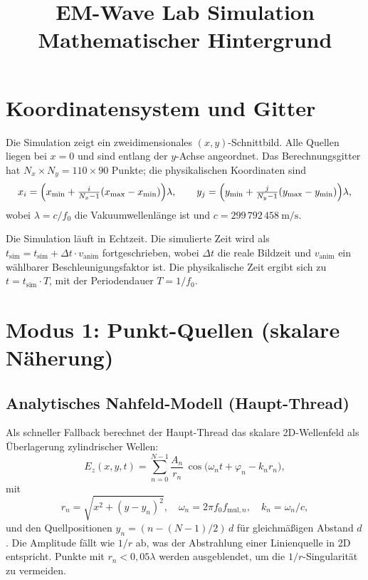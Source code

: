 \documentclass[11pt,a4paper]{article}
\title{\textbf{EM-Wave Lab Simulation}\\[0.4em]
       \large Mathematischer Hintergrund}
\author{}
\date{}
\begin{document}
\maketitle
\tableofcontents
\bigskip

\section{Koordinatensystem und Gitter}

Die Simulation zeigt ein zweidimensionales $(x,y)$-Schnittbild.  Alle
Quellen liegen bei $x = 0$ und sind entlang der $y$-Achse angeordnet.  Das
Berechnungsgitter hat $N_x \times N_y = 110 \times 90$ Punkte; die physikalischen
Koordinaten sind
\[
  x_i = \Bigl(x_{\min} + \tfrac{i}{N_x - 1}(x_{\max} - x_{\min})\Bigr)\lambda,
  \qquad
  y_j = \Bigl(y_{\min} + \tfrac{j}{N_y - 1}(y_{\max} - y_{\min})\Bigr)\lambda,
\]
wobei $\lambda = c/f_0$ die Vakuumwellenlänge ist und $c = 299\,792\,458\ \text{m/s}$.

Die Simulation läuft in Echtzeit.  Die simulierte Zeit wird als
$t_{\text{sim}} = t_{\text{sim}} + \Delta t \cdot v_{\text{anim}}$ fortgeschrieben,
wobei $\Delta t$ die reale Bildzeit und $v_{\text{anim}}$ ein wählbarer
Beschleunigungsfaktor ist.  Die physikalische Zeit ergibt sich zu
$t = t_{\text{sim}} \cdot T$, mit der Periodendauer $T = 1/f_0$.

\section{Modus 1: Punkt-Quellen (skalare Näherung)}

\subsection{Analytisches Nahfeld-Modell (Haupt-Thread)}

Als schneller Fallback berechnet der Haupt-Thread das skalare 2D-Wellenfeld
als Überlagerung zylindrischer Wellen:
\[
  E_z(x, y, t) = \sum_{n=0}^{N-1}
    \frac{A_n}{r_n}\,\cos\!\bigl(\omega_n t + \varphi_n - k_n r_n\bigr),
\]
mit
\[
  r_n = \sqrt{x^2 + (y - y_n)^2}, \quad
  \omega_n = 2\pi f_0 f_{\text{mul},n}, \quad
  k_n = \omega_n / c,
\]
und den Quellpositionen $y_n = (n - (N-1)/2)\,d$ für gleichmäßigen Abstand $d$.
Die Amplitude fällt wie $1/r$ ab, was der Abstrahlung einer Linienquelle in 2D
entspricht.  Punkte mit $r_n < 0{,}05\lambda$ werden ausgeblendet, um die
$1/r$-Singularität zu vermeiden.
\end{document}
